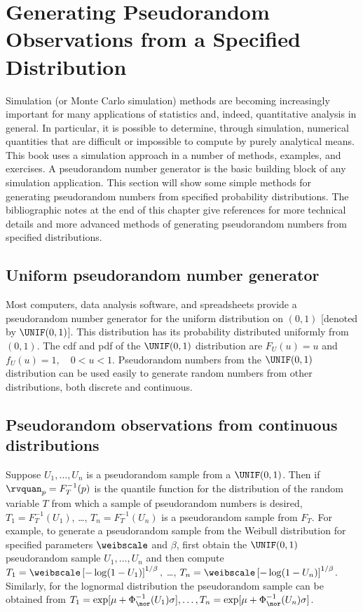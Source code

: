 \section{Generating Pseudorandom Observations from a Specified
Distribution} 
\label{section:generating.random.numbers}
Simulation (or Monte Carlo simulation) methods are becoming
increasingly important for many applications of statistics and,
indeed, quantitative analysis in general. In particular, it is
possible to determine, through simulation, numerical quantities that
are difficult or impossible to compute by purely analytical means.
This book uses a simulation approach in a number of methods, examples,
and exercises. A pseudorandom number generator is the basic building
block of any simulation application.  This section will show some
simple methods for generating pseudorandom numbers from specified
probability distributions. The bibliographic notes at the end of this
chapter give references for more technical details and more advanced
methods of generating pseudorandom numbers from specified
distributions.

\subsection{Uniform pseudorandom number generator}
Most computers, data analysis software, and spreadsheets provide a
pseudorandom number generator for the uniform distribution on
$(0,1)$
[denoted by $\UNIF(0,1)$].
This distribution has its probability distributed uniformly from
$(0,1)$. The cdf and pdf of the $\UNIF(0,1)$ distribution are $
F_{U}(u)=u$ and $f_{U}(u)=1, \quad 0 < u < 1.$ Pseudorandom numbers
from the $\UNIF(0,1)$ distribution can be used  easily to generate random
numbers from other distributions, both discrete and continuous.

\subsection{Pseudorandom observations from continuous distributions}
\label{section:prandom.cont.dist}
Suppose $U_{1},\dots,U_{n}$ is a pseudorandom sample from a
$\UNIF(0,1)$. Then if $\rvquan_{p}=F_{T}^{-1}(p)$ is the quantile
function for the distribution of the random variable $T$ from which
a sample of pseudorandom numbers is desired,
$T_{1}=F_{T}^{-1}(U_{1})$, \dots, $T_{n}=F_{T}^{-1}(U_{n})$ is a
pseudorandom sample from $F_{T}$. For example, to generate a
pseudorandom sample from the Weibull distribution for specified
parameters $\weibscale$ and $\beta$, first obtain the $\UNIF(0,1)$
pseudorandom sample $U_{1},\dots,U_{n}$ and then compute
$T_{1}=\weibscale \left [-\log(1-U_{1})
\right ]^{1/\beta},$ \ldots, $T_{n}=\weibscale \left [-\log(1-U_{n})
\right ]^{1/\beta}$. Similarly, for the lognormal distribution the
pseudorandom sample can be obtained from $T_{1}=\exp[\mu + \Phi_{\nor}
^{-1}(U_{1})\sigma], \ldots, T_{n}=\exp[\mu + \Phi_{\nor}
^{-1}  (U_{n})\sigma  ]$.

